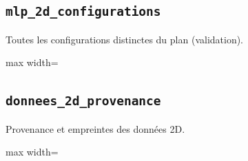\documentclass[a4paper,10pt]{article}
\newcommand{\tablesroot}{results/tables}
\begin{document}
\noindent\begin{minipage}{\linewidth}
\subsection*{\texttt{mlp\_2d\_configurations}}
Toutes les configurations distinctes du plan (validation).
\par
\begingroup\centering\footnotesize
\begin{adjustbox}{max width=\linewidth}

\end{adjustbox}\par
\endgroup
\end{minipage}
\par\medskip

\noindent\begin{minipage}{\linewidth}
\subsection*{\texttt{donnees\_2d\_provenance}}
Provenance et empreintes des donn\'ees 2D.
\par
\begingroup\centering\footnotesize
\begin{adjustbox}{max width=\linewidth}

\end{adjustbox}\par
\endgroup
\end{minipage}
\par\medskip
\end{document}

